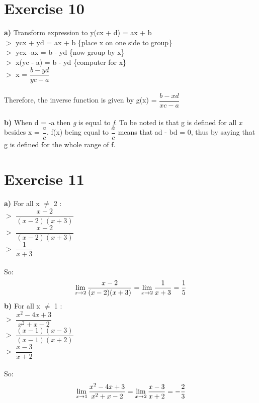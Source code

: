 \documentclass{article}
\begin{document}
  \section*{Exercise 10}
  \textbf{a)} Transform expression to y(cx + d) = ax + b \\
  $>$ ycx + yd = ax + b \{place x on one side to group\} \\ 
  $>$ ycx -ax = b - yd  \{now group by x\} \\
  $>$ x(yc - a) = b - yd \{computer for x\} \\
  $>$ x = $\dfrac{b-yd}{yc-a}$ \\ \\
  Therefore, the inverse function is given by g(x) = $\dfrac{b-xd}{xc-a}$ \\ \\
  \textbf{b)} When d = -a then \textit{g} is equal to \textit{f}. To be noted is that g is defined for all \textit{x} besides x = $\dfrac{a}{c}$. f(x) being equal to $\dfrac{a}{c}$ means that ad - bd = 0, thus by saying that g is defined for the whole range of f.
   
  
  \section*{Exercise 11}
  
  \textbf{a)} For all x $\neq$ 2 : \\ 
  $>$ $\dfrac{x-2}{(x-2)(x+3)}$ \\
  $>$ $\dfrac{x-2}{(x-2)(x+3)}$ \\
  $>$ $\dfrac{1}{x+3}$ \\ \\
  So: 
  $$\lim_{x\to2} \dfrac{x-2}{(x-2)(x+3)} = \lim_{x\to2} \\ \\ \dfrac{1}{x+3} = \dfrac{1}{5}$$
  \textbf{b)} For all x $\neq$ 1 : \\
  $>$ $\dfrac{x^2 -4x + 3}{x^2 + x - 2}$ \\
  $>$ $\dfrac{(x-1)(x-3)}{(x-1)(x+2)}$ \\
  $>$ $\dfrac{x-3}{x+2}$ \\ \\
  So:
  $$\lim_{x\to1} \dfrac{x^2 -4x + 3}{x^2 + x - 2} = \lim_{x\to2} \\ \\ \dfrac{x-3}{x+2} = -\dfrac{2}{3}$$
  
  
\end{document}
